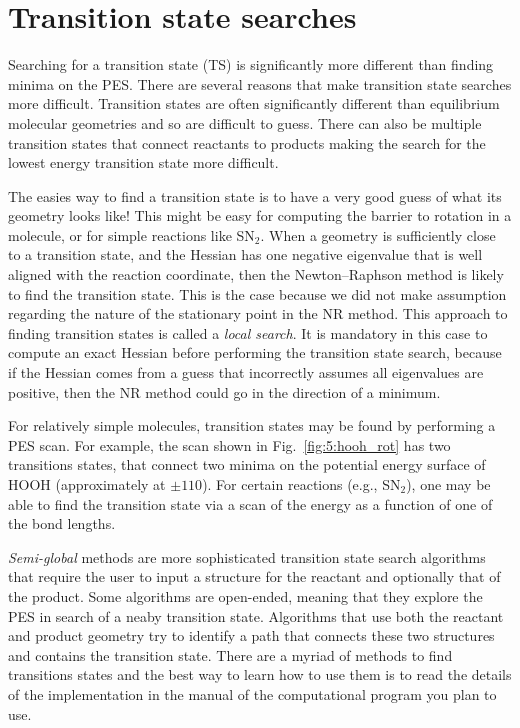 \documentclass[../Main/chem371-notes.tex]{subfiles}
\begin{document}
\section{Transition state searches}

Searching for a transition state (TS) is significantly more different than finding minima on the PES.
There are several reasons that make transition state searches more difficult. Transition states are often significantly different than equilibrium molecular geometries and so are difficult to guess. There can also be multiple transition states that connect reactants to products making the search for the lowest energy transition state more difficult.

The easies way to find a transition state is to have a very good guess of what its geometry looks like!
This might be easy for computing the barrier to rotation in a molecule, or for simple reactions like SN$_2$.
When a geometry is sufficiently close to a transition state, and the Hessian has one negative eigenvalue that is well aligned with the reaction coordinate, then the Newton--Raphson method is likely to find the transition state.
This is the case because we did not make assumption regarding the nature of the stationary point in the NR method.
This approach to finding transition states is called a \emph{local search}.
It is mandatory in this case to compute an exact Hessian before performing the transition state search, because if the Hessian comes from a guess that incorrectly assumes all eigenvalues are positive, then the NR method could go in the direction of a minimum.

For relatively simple molecules, transition states may be found by performing a PES scan.
For example, the scan shown in Fig.~\ref{fig:5:hooh_rot} has two transitions states, that connect two minima on the potential energy surface of HOOH (approximately at $\pm 110$\textdegree).
For certain reactions (e.g., SN$_2$), one may be able to find the transition state via a scan of the energy as a function of one of the bond lengths.

\emph{Semi-global} methods are more sophisticated transition state search algorithms that require the user to input a structure for the reactant and optionally that of the product.
Some algorithms are open-ended, meaning that they explore the PES in search of a neaby transition state.
Algorithms that use both the reactant and product geometry try to identify a path that connects these two structures and contains the transition state.
There are a myriad of methods to find transitions states and the best way to learn how to use them is to read the details of the implementation in the manual of the computational program you plan to use.
\end{document}
